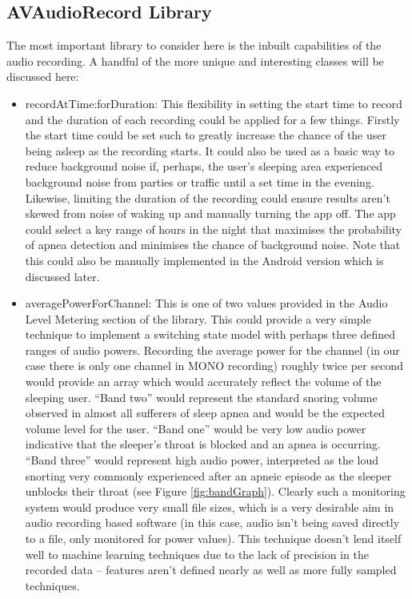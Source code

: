 \subsection{AVAudioRecord Library}
The most important library to consider here is the inbuilt capabilities of the audio recording. A handful of the more unique and interesting classes will be discussed here:
\begin{itemize}
\item recordAtTime:forDuration: This flexibility in setting the start time to record and the duration of each recording could be applied for a few things. Firstly the start time could be set such to greatly increase the chance of the user being asleep as the recording starts. It could also be used as a basic way to reduce background noise if, perhaps, the user's sleeping area experienced background noise from parties or traffic until a set time in the evening. Likewise, limiting the duration of the recording could ensure results aren't skewed from noise of waking up and manually turning the app off. The app could select a key range of hours in the night that maximises the probability of apnea detection and minimises the chance of background noise. Note that this could also be manually implemented in the Android version which is discussed later.
\item averagePowerForChannel: This is one of two values provided in the Audio Level Metering section of the library. This could provide a very simple technique to implement a switching state model with perhaps three defined ranges of audio powers. Recording the average power for the channel (in our case there is only one channel in MONO recording) roughly twice per second would provide an array which would accurately reflect the volume of the sleeping user. ``Band two'' would represent the standard snoring volume observed in almost all sufferers of sleep apnea and would be the expected volume level for the user. ``Band one'' would be very low audio power indicative that the sleeper's throat is blocked and an apnea is occurring. ``Band three'' would represent high audio power, interpreted as the loud snorting very commonly experienced after an apneic episode as the sleeper unblocks their throat (see Figure \ref{fig:bandGraph}). Clearly such a monitoring system would produce very small file sizes, which is a very desirable aim in audio recording based software (in this case, audio isn't being saved directly to a file, only monitored for power values). This technique doesn't lend itself well to machine learning techniques due to the lack of precision in the recorded data -- features aren't defined nearly as well as more fully sampled techniques.

\end{itemize}
